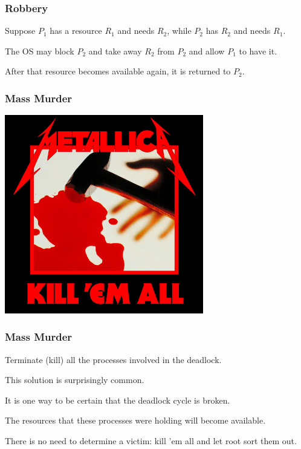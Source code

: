 \begin{frame}
	\frametitle{Robbery}


	Suppose $P_{1}$ has a resource $R_{1}$ and needs $R_{2}$, while $P_{2}$ has $R_{2}$ and needs $R_{1}$.

	The OS may block $P_{2}$ and take away $R_{2}$ from $P_{2}$ and allow $P_{1}$ to have it.

	After that resource becomes available again, it is returned to $P_{2}$.


\end{frame}

\begin{frame}
	\frametitle{Mass Murder}

	\begin{center}
		\includegraphics[width=0.65\textwidth]{images/killemall.jpg}
	\end{center}

\end{frame}

\begin{frame}
	\frametitle{Mass Murder}

	Terminate (kill) all the processes involved in the deadlock.

	This solution is surprisingly common.

	It is one way to be certain that the deadlock cycle is broken.

	The resources that these processes were holding will become available.

	There is no need to determine a victim: kill 'em all and let root sort them out.

\end{frame}

